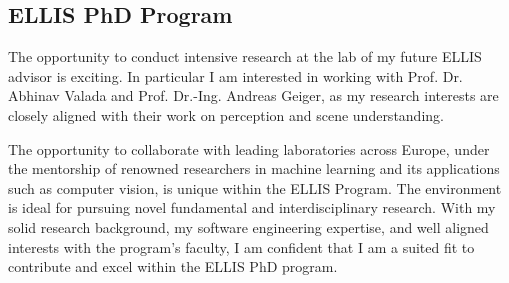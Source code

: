 \subsection{\textbf{ELLIS PhD Program}}
The opportunity to conduct intensive research at the lab of my future ELLIS advisor is exciting. In particular I am interested in working with Prof. Dr. Abhinav Valada and Prof. Dr.-Ing. Andreas Geiger, as my research interests are closely aligned with their work on perception and scene understanding.

The opportunity to collaborate with leading laboratories across Europe, under the mentorship of renowned researchers in machine learning and its applications such as computer vision, is unique within the ELLIS Program. The environment is ideal for pursuing novel fundamental and interdisciplinary research. With my solid research background, my software engineering expertise, and well aligned interests with the program’s faculty, I am confident that I am a suited fit to contribute and excel within the ELLIS PhD program.